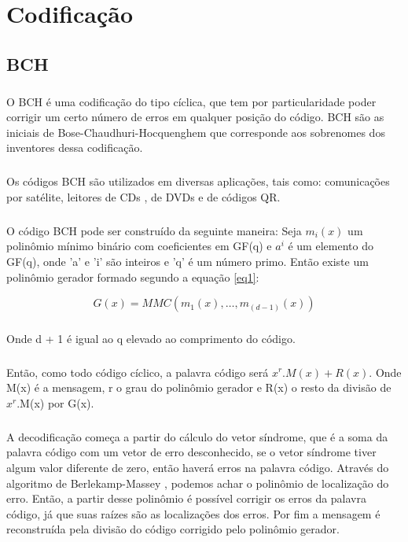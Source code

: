 \chapter{Codificação}
\section{BCH}

\paragraph{}O BCH é uma codificação do tipo cíclica, que tem por particularidade poder corrigir um certo número de erros em qualquer posição do código. BCH são as iniciais de Bose-Chaudhuri-Hocquenghem que corresponde aos sobrenomes dos inventores dessa codificação.

\paragraph{} Os códigos BCH são utilizados em diversas aplicações, tais como: comunicações por satélite, leitores de CDs , de DVDs e de códigos QR.

\paragraph{}O código BCH pode ser construído da seguinte maneira: Seja $m_i(x)$ um polinômio mínimo binário com coeficientes em GF(q) e $a^i$ é um elemento do GF(q), onde 'a' e 'i' são inteiros e 'q' é um número primo. Então existe um polinômio gerador formado segundo a equação \ref{eq1}:

\begin{equation}
\label{eq1}
G(x) = MMC(m_1(x),…, m_{(d - 1)}(x))
\end{equation}

\paragraph{} Onde d + 1 é igual ao q elevado ao comprimento do código. 

\paragraph{} Então, como todo código cíclico, a palavra código será $x^r.M(x) + R(x)$. Onde M(x) é a mensagem, r o grau do polinômio gerador e R(x) o resto da divisão de $x^r$.M(x) por G(x).

\paragraph{} A decodificação começa a partir do cálculo do vetor síndrome, que é a soma da palavra código com um vetor de erro desconhecido, se o vetor síndrome tiver algum valor diferente de zero, então haverá erros na palavra código. Através do algoritmo de Berlekamp-Massey \citep{berlekamp}, podemos achar o polinômio de localização do erro. Então, a partir desse polinômio é possível corrigir os erros da palavra código, já que suas raízes são as localizações dos erros. Por fim a mensagem é reconstruída pela divisão do código corrigido pelo polinômio gerador.

